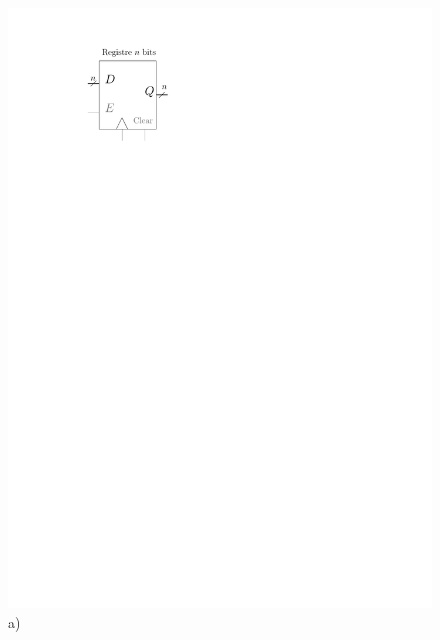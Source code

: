 \begin{figure}[htbp]
   \begin{minipage}[c]{.2\linewidth}
\includegraphics[width=\columnwidth]{Figs/registre.pdf}\\\centering a)
\end{minipage}\hfill
\begin{minipage}[c]{.4\linewidth}

\end{minipage}
\end{figure}
